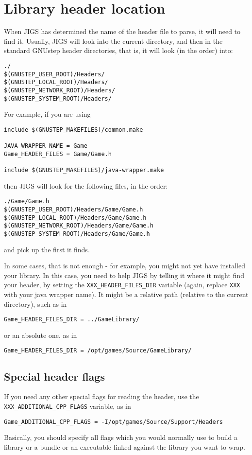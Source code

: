 \section{Library header location}
When JIGS has determined the name of the header file to parse, it will
need to find it.  Usually, JIGS will look into the current directory,
and then in the standard GNUstep header directories, that is, it will
look (in the order) into:
\begin{verbatim}
./
$(GNUSTEP_USER_ROOT)/Headers/
$(GNUSTEP_LOCAL_ROOT)/Headers/
$(GNUSTEP_NETWORK_ROOT)/Headers/
$(GNUSTEP_SYSTEM_ROOT)/Headers/
\end{verbatim}
For example, if you are using
\begin{verbatim}
include $(GNUSTEP_MAKEFILES)/common.make

JAVA_WRAPPER_NAME = Game
Game_HEADER_FILES = Game/Game.h

include $(GNUSTEP_MAKEFILES)/java-wrapper.make
\end{verbatim}
then JIGS will look for the following files, in the order:
\begin{verbatim}
./Game/Game.h
$(GNUSTEP_USER_ROOT)/Headers/Game/Game.h
$(GNUSTEP_LOCAL_ROOT)/Headers/Game/Game.h
$(GNUSTEP_NETWORK_ROOT)/Headers/Game/Game.h
$(GNUSTEP_SYSTEM_ROOT)/Headers/Game/Game.h
\end{verbatim}
and pick up the first it finds.

In some cases, that is not enough - for example, you might not yet
have installed your library.  In this case, you need to help JIGS by
telling it where it might find your header, by setting the
\texttt{XXX\_HEADER\_FILES\_DIR} variable (again, replace \texttt{XXX}
with your java wrapper name).  It might be a relative path (relative
to the current directory), such as in
\begin{verbatim}
Game_HEADER_FILES_DIR = ../GameLibrary/
\end{verbatim}
or an absolute one, as in 
\begin{verbatim}
Game_HEADER_FILES_DIR = /opt/games/Source/GameLibrary/
\end{verbatim}

\subsection{Special header flags}
If you need any other special flags for reading the header, use the 
\texttt{XXX\_ADDITIONAL\_CPP\_FLAGS} variable, as in
\begin{verbatim}
Game_ADDITIONAL_CPP_FLAGS = -I/opt/games/Source/Support/Headers
\end{verbatim}
Basically, you should specify all flags which you would normally use
to build a library or a bundle or an executable linked against the
library you want to wrap.

